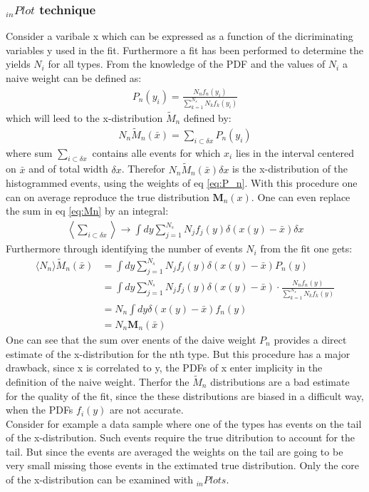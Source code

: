 \documentclass[english]{uzhpub}
\begin{document}
\subsubsection{$_{in} Plot$ technique}
Consider a varibale x which can be expressed as a function of the dicriminating variables y used in the fit. Furthermore a fit has been performed to determine the yields $N_i$ for all types. From the knowledge of the PDF and the values of $N_i$ a naive weight can be defined as:
\begin{align}
  P_n(y_i) = \frac{N_n f_n(y_i)}{\sum_{k=1}^{N_s} N_k f_k(y_i)} \label{eq:P_n}
\end{align}
which will leed to the x-distribution $\tilde{M}_n$ defined by:
\begin{align}
  N_n \tilde{M}_n (\bar{x}) = \sum_{i \subset \delta x} P_n (y_i) \label{eq:Mn}
\end{align}
where sum $\sum_{i \subset \delta x}$ contains alle events for which $x_i$ lies in the interval centered on $\bar{x}$ and of total width $\delta x$.
Therefor $N_n \tilde{M}_n (\bar{x}) \delta x$ is the x-distribution of the histogrammed events, using the weights of eq \ref{eq:P_n}.
With this procedure one can on average reproduce the true distribution $\textbf{M}_n(x)$. One can even replace the sum in eq \ref{eq:Mn} by an integral:
\begin{align}
  \left \langle \sum_{i \subset \delta x} \right \rangle \rightarrow \int dy \sum_{j=1}^{N_s} N_j f_j (y) \delta (x(y) - \bar{x}) \delta x \label{eq:average}
\end{align}
Furthermore through identifying the number of events $N_i$ from the fit one gets:
\begin{align}
  \langle N_n \rangle \tilde{M}_n (\bar{x}) & = \int dy \sum_{j=1}^{N_s} N_j f_j (y) \delta (x(y) - \bar{x}) P_n (y) \\
  & = \int dy \sum_{j=1}^{N_s} N_j f_j (y) \delta (x(y)- \bar{x}) \cdot \frac{N_n f_n (y)}{\sum_{k=1}^{N_s} N_k f_k (y)} \\
  & = N_n \int dy \delta (x(y) - \bar{x}) f_n (y) \\
  & = N_n \textbf{M}_n(\bar{x}) \label{eq:N_nM_n}
\end{align}
One can see that the sum over enents of the daive weight $P_n$ provides a direct estimate of the x-distribution for the nth type.
But this procedure has a major drawback, since x is correlated to y, the PDFs of x enter implicity in the definition of the naive weight. Therfor the $\tilde{M}_n$ distributions are a bad estimate for the quality of the fit, since the these distributions are biased in a difficult way, when the PDFs $f_i(y)$ are not accurate. \\
Consider for example a data sample where one of the types has events on the tail of the x-distribution. Such events require the true ditribution to account for the tail. But since the events are averaged the weights on the tail are going to be very small missing those events in the extimated true distribution. Only the core of the x-distribution can be examined with $_{in} Plots$.
\end{document}
